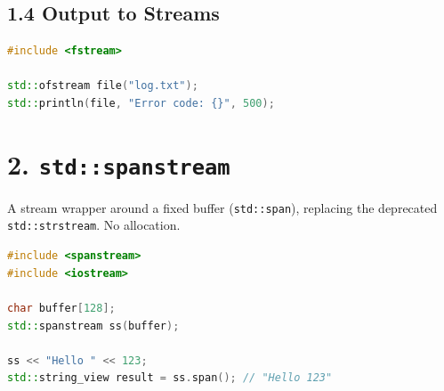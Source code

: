 \hypertarget{output-to-streams}{%
\subsection{1.4 Output to Streams}\label{output-to-streams}}

\begin{lstlisting}[language={C++}]
#include <fstream>

std::ofstream file("log.txt");
std::println(file, "Error code: {}", 500);
\end{lstlisting}

\hypertarget{stdspanstream}{%
\section{\texorpdfstring{2.
\texttt{std::spanstream}}{2. std::spanstream}}\label{stdspanstream}}

A stream wrapper around a fixed buffer
(\passthrough{\lstinline!std::span!}), replacing the deprecated
\passthrough{\lstinline!std::strstream!}. No allocation.

\begin{lstlisting}[language={C++}]
#include <spanstream>
#include <iostream>

char buffer[128];
std::spanstream ss(buffer);

ss << "Hello " << 123;
std::string_view result = ss.span(); // "Hello 123"
\end{lstlisting}
